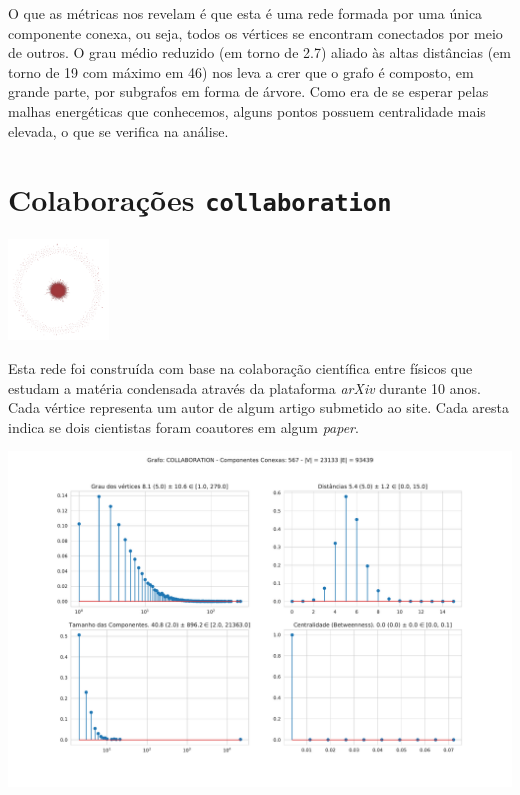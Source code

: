 \documentclass{homework}
\begin{document}
	O que as métricas nos revelam é que esta é uma rede formada por uma única componente conexa, ou seja, todos os vértices se encontram conectados por meio de outros. O grau médio reduzido (em torno de 2.7) aliado às altas distâncias (em torno de 19 com máximo em 46) nos leva a crer que o grafo é composto, em grande parte, por subgrafos em forma de árvore. Como era de se esperar pelas malhas energéticas que conhecemos, alguns pontos possuem centralidade mais elevada, o que se verifica na análise.
	
	\section{Colaborações \texttt{collaboration}}
	
	\begin{multicols}{2}
		\begin{fig}
			\includegraphics[width=0.2\textwidth]{../results/collaboration-graph.png}
		\end{fig}
	
		Esta rede foi construída com base na colaboração científica entre físicos que estudam a matéria condensada através da plataforma \textit{arXiv} durante 10 anos. Cada vértice representa um autor de algum artigo submetido ao site. Cada aresta indica se dois cientistas foram coautores em algum \textit{paper}.
	\end{multicols}
	
	
	\begin{fig}
		\includegraphics[width=\textwidth]{../results/collaboration-data.pdf}
	\end{fig}
\end{document}
